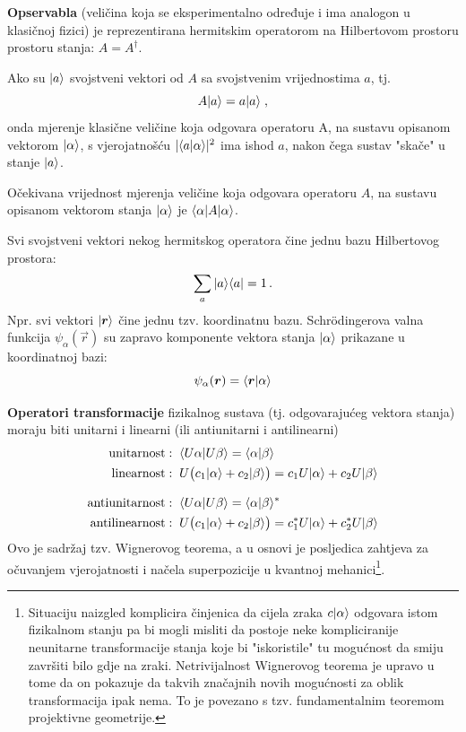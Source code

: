 \textbf{Opservabla} (veličina koja se eksperimentalno određuje i ima
 analogon u klasičnoj fizici) je reprezentirana hermitskim operatorom na
 Hilbertovom prostoru prostoru stanja: $A=A^{\dagger}$.

Ako su $| a \rangle$ svojstveni vektori od $A$ sa svojstvenim vrijednostima
$a$, tj.
\begin{displaymath}
                A| a \rangle=a| a \rangle \;,
\end{displaymath}
onda mjerenje klasične veličine koja odgovara operatoru A, na sustavu
opisanom vektorom $| \alpha \rangle$, s vjerojatnošću $|\langle a |\alpha\rangle|^2$
ima ishod $a$, nakon čega sustav "skače" u stanje $| a \rangle$.

Očekivana vrijednost mjerenja veličine koja odgovara
operatoru $A$, na sustavu opisanom vektorom stanja
$| \alpha \rangle$ je $\langle \alpha |A| \alpha \rangle$.

Svi svojstveni vektori nekog hermitskog operatora čine jednu bazu
Hilbertovog prostora:
\begin{displaymath}
             \sum_{a} | a \rangle\langle a | = 1 \,.
\end{displaymath}
Npr. svi vektori $\ket{\vec{r}}$ čine jednu tzv. koordinatnu bazu.
Schr\"{o}dingerova valna funkcija $\psi_{\alpha}(\vec{r})$ su zapravo
komponente vektora stanja $| \alpha \rangle$ prikazane u koordinatnoj
bazi:
\begin{displaymath}
            \psi_{\alpha}(\vec{r})=\bra{\vec{r}}\alpha\rangle
\end{displaymath}


\textbf{Operatori transformacije} fizikalnog sustava (tj. odgovarajućeg vektora
stanja) moraju biti unitarni i linearni (ili antiunitarni i antilinearni)
\begin{align*}
\text{unitarnost}&:\; \langle U\alpha |U\beta\rangle = \langle \alpha |\beta\rangle
   \\
\text{linearnost}&:\; U\big(c_1| \alpha \rangle+c_{2}| \beta \rangle\big)=
  c_1 U| \alpha \rangle + c_{2} U| \beta \rangle
   \\[2ex]
\text{antiunitarnost}&:\; \langle U\alpha |U\beta\rangle = \langle \alpha |\beta\rangle^*
  \\
\text{antilinearnost}&:\; U\big(c_1| \alpha \rangle+c_{2}| \beta \rangle\big)=
  c_{1}^* U| \alpha \rangle + c_{2}^* U| \beta \rangle
\end{align*}
Ovo je sadržaj tzv. Wignerovog teorema, a u osnovi
je posljedica zahtjeva za očuvanjem vjerojatnosti i
načela superpozicije u kvantnoj mehanici\footnote{Situaciju
naizgled komplicira činjenica da cijela zraka
$c| \alpha \rangle$ odgovara istom fizikalnom stanju pa bi mogli
misliti da postoje neke kompliciranije neunitarne transformacije stanja
koje bi "iskoristile" tu
mogućnost da smiju završiti bilo gdje na zraki. Netrivijalnost
Wignerovog teorema je upravo u tome da on pokazuje da takvih
značajnih novih mogućnosti za oblik transformacija ipak nema. To
je povezano s tzv. fundamentalnim teoremom projektivne geometrije.}.

